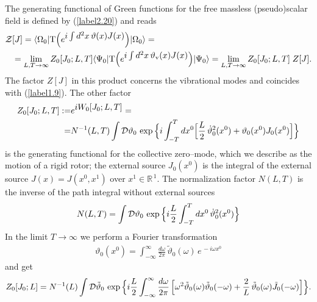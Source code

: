 \documentclass[a4paper,12pt] {article}
\begin{document}
\hspace{0.2in} The generating functional of Green functions for the
free massless (pseudo)scalar field is defined by (\ref{label2.20}) and
reads
%
\begin{eqnarray}\label{label3.1}
\begin{aligned}
{\cal Z}&[J] = \langle\Omega_0|{\rm T}\Big(e^{\textstyle i\int
d^2x\,\vartheta(x)J(x)}\Big)|\Omega_0\rangle =\\
 &= \lim_{L,T \to \infty} Z_0[J_0;L,T] \langle\Psi_0|{\rm T}\Big(e^{\textstyle i\int d^2x\,
\vartheta_{\mathrm v}(x)J(x)}\Big)|\Psi_0\rangle 
= \lim_{L,T \to \infty}Z_0[J_0;L,T] \; Z[J].
\end{aligned}
\end{eqnarray}
%
The factor $Z[J]$ in this product concerns the vibrational modes and
coincides with (\ref{label1.9}). The other factor
%
\begin{eqnarray}\label{label3.2}
\begin{aligned}
Z_0[J_0;L,T] :=& e^{\textstyle iW_0[J_0;L,T]}=\\ =&N^{-1}(L,T)\int
{\cal D}\vartheta_0\, \exp\Big\{i\int^T_{-T}dx^0\Big[\frac{L}{2}\,
\dot{\vartheta}^2_0(x^0) + \vartheta_0(x^0)J_0(x^0)\Big]\Big\}
\end{aligned}
\end{eqnarray}
%
is the generating functional for the collective zero--mode, which we
describe as the motion of a rigid rotor; the external source
$J_0(x^0)$ is the integral of the external source $J(x) = J(x^0, x^1)$
over $x^1 \in \mathbb{R}^{\,1}$. The normalization factor $N(L,T)$ is
the inverse of the path integral without external sources
%
\begin{eqnarray}\label{label3.3}
N(L,T)=\int {\cal D}\vartheta_0\,
\exp\Big\{i\frac{L}{2}\int^T_{-T}dx^0\, \dot{\vartheta}^2_0(x^0)\Big\}
\end{eqnarray}
In the limit $T\to \infty$ we perform
a Fourier transformation
%
\begin{eqnarray}\label{label3.4}
\vartheta_0(x^0) = \int^{\infty}_{-\infty}\frac{d\omega}{2\pi}\,
\tilde{\vartheta}_0(\omega)\,e^{\textstyle\,-i\omega x^0}
\end{eqnarray}
%
and get
%
\begin{eqnarray}\label{label3.5}
Z_0[J_0;L] = N^{-1}(L) \int {\cal D}\tilde{\vartheta}_0\, 
\exp\Big\{i\frac{L}{2}\int^{\infty}_{-\infty}
\frac{d\omega}{2\pi}\,\Big[\omega^2\tilde{\vartheta}_0
(\omega)\tilde{\vartheta}_0(-\omega)
+\frac{2}{L}\,\tilde{\vartheta}_0(\omega)
\tilde{J}_0(-\omega)\Big]\Big\}.
\end{eqnarray}
\end{document}
